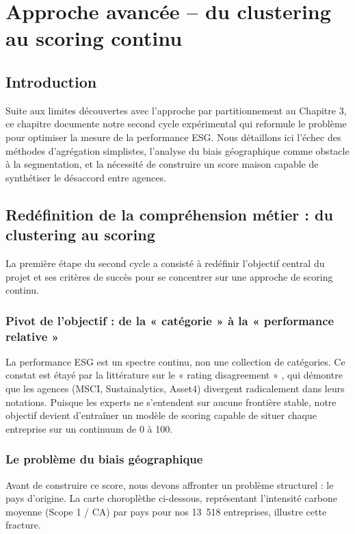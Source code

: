 \chapter{Approche avancée – du clustering au scoring continu}

\section*{Introduction}
Suite aux limites découvertes avec l'approche par partitionnement au Chapitre 3, ce chapitre documente notre second cycle expérimental qui reformule le problème pour optimiser la mesure de la performance ESG. Nous détaillons ici l'échec des méthodes d'agrégation simplistes, l'analyse du biais géographique comme obstacle à la segmentation, et la nécessité de construire un score maison capable de synthétiser le désaccord entre agences.

\section{Redéfinition de la compréhension métier : du clustering au scoring}

La première étape du second cycle a consisté à redéfinir l'objectif central du projet et ses critères de succès pour se concentrer sur une approche de scoring continu.

\subsection{Pivot de l'objectif : de la « catégorie » à la « performance relative »}

La performance ESG est un spectre continu, non une collection de catégories. Ce constat est étayé par la littérature sur le « rating disagreement » \citep{bissoondoyal2024}, qui démontre que les agences (MSCI, Sustainalytics, Asset4) divergent radicalement dans leurs notations. Puisque les experts ne s'entendent sur aucune frontière stable, notre objectif devient d'entraîner un modèle de scoring capable de situer chaque entreprise sur un continuum de 0 à 100.

\subsection{Le problème du biais géographique}

Avant de construire ce score, nous devons affronter un problème structurel : le pays d'origine. La carte choroplèthe ci-dessous, représentant l'intensité carbone moyenne (Scope 1 / CA) par pays pour nos 13~518 entreprises, illustre cette fracture.

